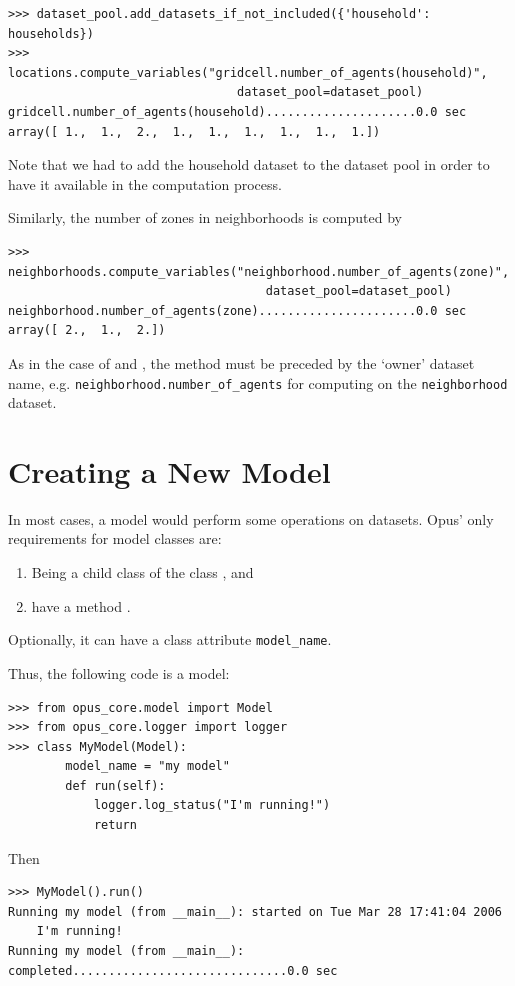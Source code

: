 \begin{verbatim}
>>> dataset_pool.add_datasets_if_not_included({'household': households})
>>> locations.compute_variables("gridcell.number_of_agents(household)",
                                dataset_pool=dataset_pool)
gridcell.number_of_agents(household).....................0.0 sec
array([ 1.,  1.,  2.,  1.,  1.,  1.,  1.,  1.,  1.])
\end{verbatim}
Note that we had to add the household dataset to the dataset pool 
in order to have it available in the computation process.

Similarly, the number of zones in neighborhoods is computed by

\begin{verbatim}
>>> neighborhoods.compute_variables("neighborhood.number_of_agents(zone)",
                                    dataset_pool=dataset_pool)
neighborhood.number_of_agents(zone)......................0.0 sec
array([ 2.,  1.,  2.])
\end{verbatim}

As in the case of  and , the
 method must be preceded by the `owner' dataset
name, e.g. \verb|neighborhood.number_of_agents| for computing on the
\verb|neighborhood| dataset.


\section{Creating a New Model}
%
\label{sec:tut-creating-new-model}
In most cases, a model would perform some operations on datasets. Opus' only
requirements for model classes are:
\begin{enumerate}
\item Being a child class of the  class , and
\item have a method .
\end{enumerate}
Optionally, it can have a class attribute \verb|model_name|.

Thus, the following code is a model:
\begin{verbatim}
>>> from opus_core.model import Model
>>> from opus_core.logger import logger
>>> class MyModel(Model):
        model_name = "my model"
        def run(self):
            logger.log_status("I'm running!")
            return
\end{verbatim}
Then
\begin{verbatim}
>>> MyModel().run()
Running my model (from __main__): started on Tue Mar 28 17:41:04 2006
    I'm running!
Running my model (from __main__): completed..............................0.0 sec
\end{verbatim}

